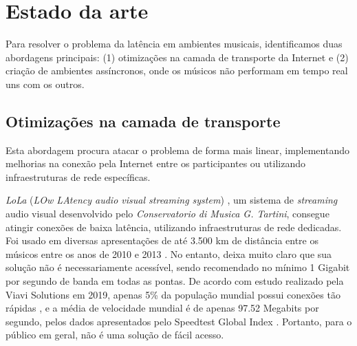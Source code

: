 \section{Estado da arte}


Para resolver o problema da latência em ambientes musicais, identificamos duas abordagens principais: (1) otimizações na camada de transporte da Internet e (2) criação de ambientes assíncronos, onde os músicos não performam em tempo real uns com os outros.

\subsection{Otimizações na camada de transporte}
\label{sec:delay-based-audio-solutions}

Esta abordagem procura atacar o problema de forma mais linear, implementando melhorias na conexão pela Internet entre os participantes ou utilizando infraestruturas de rede específicas.

\textit{LoLa} (\textit{LOw LAtency audio visual streaming system}) \cite{lola}, um sistema de \textit{streaming} audio visual desenvolvido pelo \textit{Conservatorio di Musica G. Tartini}, consegue atingir conexões de baixa latência, utilizando infraestruturas de rede dedicadas. Foi usado em diversas apresentações de até 3.500 km de distância entre os músicos entre os anos de 2010 e 2013 \cite{lola_streaming}. No entanto, deixa muito claro que sua solução não é necessariamente acessível, sendo recomendado no mínimo 1 Gigabit por segundo de banda em todas as pontas. De acordo com estudo realizado pela Viavi Solutions em 2019, apenas 5\% da população mundial possui conexões tão rápidas \cite{1gbps}, e a média de velocidade mundial é de apenas 97.52 Megabits por segundo, pelos dados apresentados pelo Speedtest Global Index \cite{speed_test}. Portanto, para o público em geral, não é uma solução de fácil acesso.

